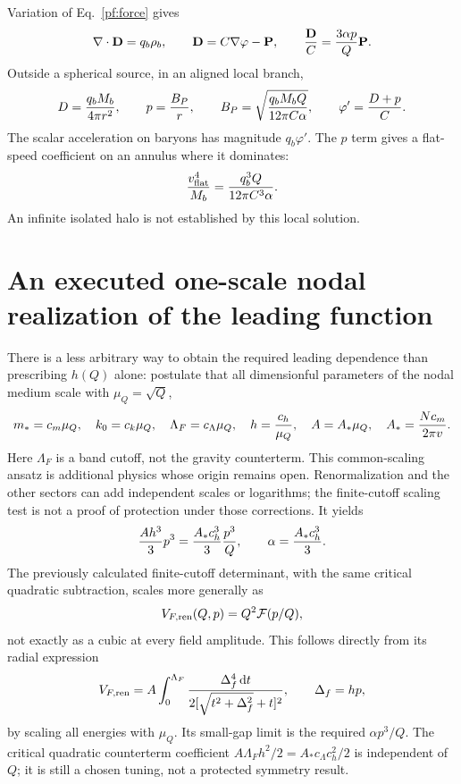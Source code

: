 \documentclass[11pt]{article}
\newcommand{\dd}{\mathrm d}
\begin{document}
Variation of Eq.~\eqref{pf:force} gives
\begin{equation}
 \nabla\cdot\mathbf D=q_b\rho_b,\qquad
 \mathbf D=C\nabla\varphi-\mathbf P,\qquad
 {\mathbf D\over C}={3\alpha p\over Q}\mathbf P.
\end{equation}
Outside a spherical source, in an aligned local branch,
\begin{equation}
 D={q_bM_b\over4\pi r^2},\qquad
 p={B_P\over r},\qquad
 B_P=\sqrt{{q_bM_bQ\over12\pi C\alpha}},\qquad
 \varphi'={D+p\over C}.
\end{equation}
The scalar acceleration on baryons has magnitude $q_b\varphi'$.
The $p$ term gives a flat-speed coefficient on an annulus where it dominates:
\begin{equation}
 {v_{\rm flat}^4\over M_b}={q_b^3Q\over12\pi C^3\alpha}.
 \label{pf:TF}
\end{equation}
An infinite isolated halo is not established by this local solution.

\section{An executed one-scale nodal realization of the leading function}
There is a less arbitrary way to obtain the required leading dependence
than prescribing $h(Q)$ alone: postulate that all dimensionful parameters
of the nodal medium scale with $\mu_Q=\sqrt Q$,
\begin{equation}
 m_*=c_m\mu_Q,\quad k_0=c_k\mu_Q,\quad
 \Lambda_F=c_\Lambda\mu_Q,\quad h={c_h\over\mu_Q},\quad
 A=A_*\mu_Q,\quad A_*={Nc_m\over2\pi v}.
\end{equation}
Here $\Lambda_F$ is a band cutoff, not the gravity counterterm. This
common-scaling ansatz is additional physics whose origin remains open.
Renormalization and the other sectors can add independent scales or
logarithms; the finite-cutoff scaling test is not a proof of protection
under those corrections.
It yields
\begin{equation}
 {A h^3\over3}p^3={A_*c_h^3\over3}{p^3\over Q},\qquad
 \alpha={A_*c_h^3\over3}.
\end{equation}
The previously calculated finite-cutoff determinant, with the same critical
quadratic subtraction, scales more generally as
\begin{equation}
 V_{F,\rm ren}(Q,p)=Q^2\mathcal F(p/Q),
\end{equation}
not exactly as a cubic at every field amplitude. This follows directly
from its radial expression
\begin{equation}
 V_{F,\rm ren}=A\int_0^{\Lambda_F}
 {\Delta_f^4\,\dd t\over2[\sqrt{t^2+\Delta_f^2}+t]^2},\qquad
 \Delta_f=hp,
\end{equation}
by scaling all energies with $\mu_Q$. Its small-gap limit is the required
$\alpha p^3/Q$. The critical quadratic counterterm coefficient
$A\Lambda_Fh^2/2=A_*c_\Lambda c_h^2/2$ is independent of $Q$;
it is still a chosen tuning, not a protected symmetry result.
\end{document}
